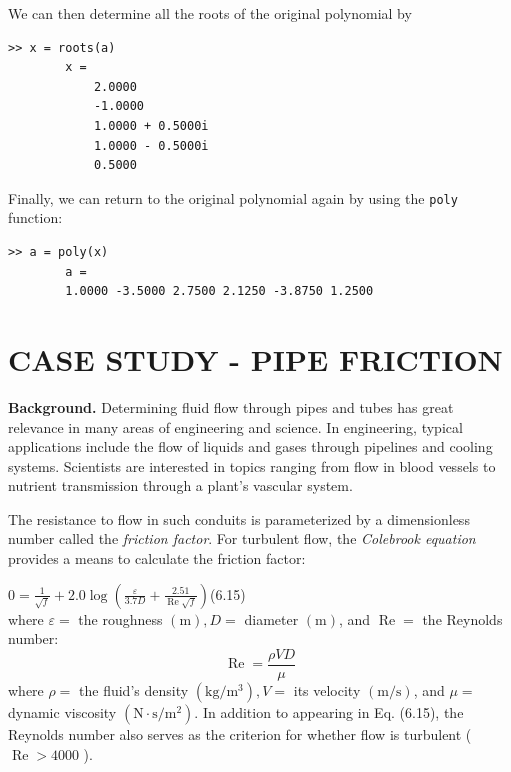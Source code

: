\documentclass[../main.tex]{subfiles}
\begin{document}
\begin{example}
    \noindent We can then determine all the roots of the original polynomial by

    \begin{lstlisting}[numbers=none,frame=none]
        >> x = roots(a)
        x =
            2.0000
            -1.0000
            1.0000 + 0.5000i
            1.0000 - 0.5000i
            0.5000
    \end{lstlisting}

    \noindent Finally, we can return to the original polynomial again by using the \texttt{poly} function:

    \begin{lstlisting}[numbers=none,frame=none]
        >> a = poly(x)
        a =
        1.0000 -3.5000 2.7500 2.1250 -3.8750 1.2500
    \end{lstlisting}

\end{example}

\section{\textbf{CASE STUDY} - PIPE FRICTION}

\textbf{Background.} Determining fluid flow through pipes and tubes has great relevance in
many areas of engineering and science. In engineering, typical applications include the flow
of liquids and gases through pipelines and cooling systems. Scientists are interested in topics
ranging from flow in blood vessels to nutrient transmission through a plant's vascular
system.

The resistance to flow in such conduits is parameterized by a dimensionless number
called the \textit{friction factor}. For turbulent flow, the \textit{Colebrook equation} provides a means to
calculate the friction factor:\medskip

$
0=\frac{1}{\sqrt{f}}+2.0 \log \left(\frac{\varepsilon}{3.7 D}+\frac{2.51}{\operatorname{Re} \sqrt{f}}\right) 
$\hfill (6.15)\\

where $\varepsilon=$ the roughness $(\mathrm{m}), D=$ diameter $(\mathrm{m})$, and $\operatorname{Re}=$ the Reynolds number:
$$
\operatorname{Re}=\frac{\rho V D}{\mu}
$$
where $\rho=$ the fluid's density $\left(\mathrm{kg} / \mathrm{m}^{3}\right), V=$ its velocity $(\mathrm{m} / \mathrm{s})$, and $\mu=$ dynamic viscosity $\left(\mathrm{N} \cdot \mathrm{s} / \mathrm{m}^{2}\right)$. In addition to appearing in Eq. (6.15), the Reynolds number also serves as the criterion for whether flow is turbulent ( $\operatorname{Re}>4000$ ).
\end{document}
